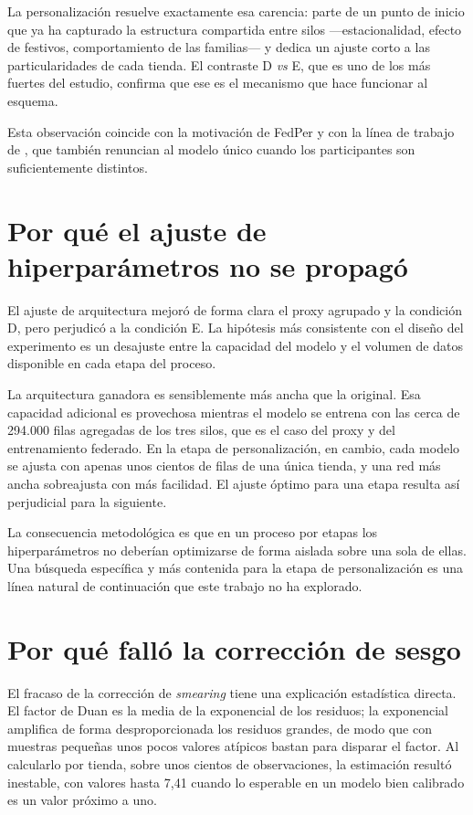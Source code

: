 La personalización resuelve exactamente esa carencia: parte de un punto de inicio que ya ha
capturado la estructura compartida entre silos —estacionalidad, efecto de festivos, comportamiento
de las familias— y dedica un ajuste corto a las particularidades de cada tienda. El contraste D
\emph{vs} E, que es uno de los más fuertes del estudio, confirma que ese es el mecanismo que hace
funcionar al esquema.

Esta observación coincide con la motivación de FedPer \parencite{arivazhagan2019} y con la línea de
trabajo de \textcite{long2025pacfl}, que también renuncian al modelo único cuando los participantes
son suficientemente distintos.

\section{Por qué el ajuste de hiperparámetros no se propagó}

El ajuste de arquitectura mejoró de forma clara el proxy agrupado y la condición D, pero perjudicó a
la condición E. La hipótesis más consistente con el diseño del experimento es un desajuste entre la
capacidad del modelo y el volumen de datos disponible en cada etapa del proceso.

La arquitectura ganadora es sensiblemente más ancha que la original. Esa capacidad adicional es
provechosa mientras el modelo se entrena con las cerca de 294.000 filas agregadas de los tres silos,
que es el caso del proxy y del entrenamiento federado. En la etapa de personalización, en cambio,
cada modelo se ajusta con apenas unos cientos de filas de una única tienda, y una red más ancha
sobreajusta con más facilidad. El ajuste óptimo para una etapa resulta así perjudicial para la
siguiente.

La consecuencia metodológica es que en un proceso por etapas los hiperparámetros no deberían
optimizarse de forma aislada sobre una sola de ellas. Una búsqueda específica y más contenida para
la etapa de personalización es una línea natural de continuación que este trabajo no ha explorado.

\section{Por qué falló la corrección de sesgo}

El fracaso de la corrección de \emph{smearing} tiene una explicación estadística directa. El factor
de Duan es la media de la exponencial de los residuos; la exponencial amplifica de forma
desproporcionada los residuos grandes, de modo que con muestras pequeñas unos pocos valores atípicos
bastan para disparar el factor. Al calcularlo por tienda, sobre unos cientos de observaciones, la
estimación resultó inestable, con valores hasta 7,41 cuando lo esperable en un modelo bien calibrado
es un valor próximo a uno.

